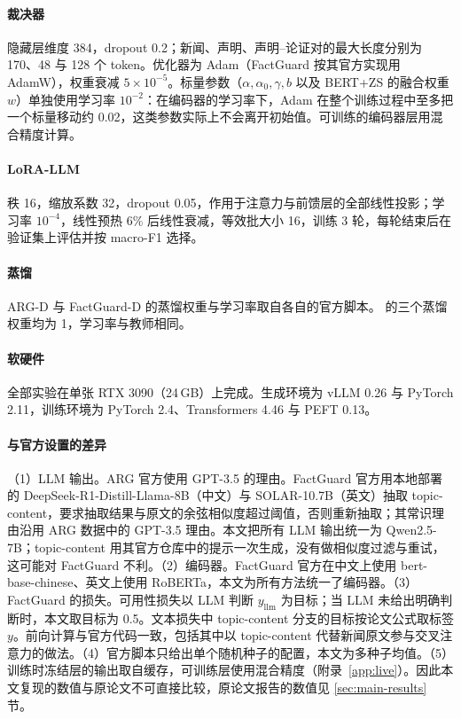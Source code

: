 \paragraph{裁决器}
隐藏层维度 384，dropout 0.2；新闻、声明、声明--论证对的最大长度分别为 170、48 与 128 个 token。优化器为 Adam（FactGuard 按其官方实现用 AdamW），权重衰减 $5\times10^{-5}$。标量参数（$\alpha,\alpha_0,\gamma,b$ 以及 BERT+ZS 的融合权重 $w$）单独使用学习率 $10^{-2}$：在编码器的学习率下，Adam 在整个训练过程中至多把一个标量移动约 0.02，这类参数实际上不会离开初始值。可训练的编码器层用混合精度计算。

\paragraph{LoRA-LLM}
秩 16，缩放系数 32，dropout 0.05，作用于注意力与前馈层的全部线性投影；学习率 $10^{-4}$，线性预热 6\% 后线性衰减，等效批大小 16，训练 3 轮，每轮结束后在验证集上评估并按 macro-F1 选择。

\paragraph{蒸馏}
ARG-D 与 FactGuard-D 的蒸馏权重与学习率取自各自的官方脚本。\student{} 的三个蒸馏权重均为 1，学习率与教师相同。

\paragraph{软硬件}
全部实验在单张 RTX 3090（24\,GB）上完成。生成环境为 vLLM 0.26 与 PyTorch 2.11，训练环境为 PyTorch 2.4、Transformers 4.46 与 PEFT 0.13。

\paragraph{与官方设置的差异}
（1）LLM 输出。ARG 官方使用 GPT-3.5 的理由。FactGuard 官方用本地部署的 DeepSeek-R1-Distill-Llama-8B（中文）与 SOLAR-10.7B（英文）抽取 topic-content，要求抽取结果与原文的余弦相似度超过阈值，否则重新抽取；其常识理由沿用 ARG 数据中的 GPT-3.5 理由\citep{he2026factguard}。本文把所有 LLM 输出统一为 Qwen2.5-7B；topic-content 用其官方仓库中的提示一次生成，没有做相似度过滤与重试，这可能对 FactGuard 不利。（2）编码器。FactGuard 官方在中文上使用 bert-base-chinese、英文上使用 RoBERTa，本文为所有方法统一了编码器。（3）FactGuard 的损失。可用性损失以 LLM 判断 $y_{\mathrm{llm}}$ 为目标；当 LLM 未给出明确判断时，本文取目标为 0.5。文本损失中 topic-content 分支的目标按论文公式取标签 $y$。前向计算与官方代码一致，包括其中以 topic-content 代替新闻原文参与交叉注意力的做法。（4）官方脚本只给出单个随机种子的配置，本文为多种子均值。（5）训练时冻结层的输出取自缓存，可训练层使用混合精度（附录~\ref{app:live}）。因此本文复现的数值与原论文不可直接比较，原论文报告的数值见 \ref{sec:main-results} 节。

